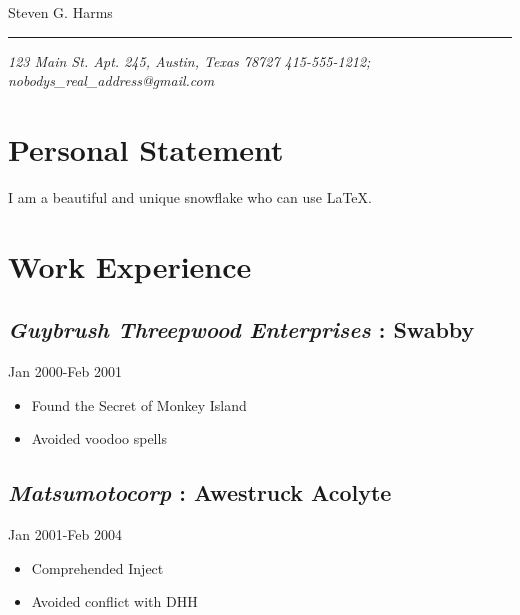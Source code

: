 \documentclass[]{article}
\begin{document}
\ifpdf
{}
\else
{}
\fi


\begin{center}
    \Huge Steven G. Harms
\end{center}
\vspace{-8pt} \rule{\textwidth}{1pt}

\vspace{-1pt} {\small\itshape 123 Main St. Apt. 245, Austin, Texas 78727  \hfill 415-555-1212; nobodys\_real\_address@gmail.com}





  \section*{ Personal Statement}
  I am a beautiful and unique snowflake who can use \LaTeX.


\section*{Work Experience}
\label{sec: work_experience}
\subsection*{\textit{Guybrush Threepwood Enterprises} : \textbf{Swabby}}
  \label{_guybrushthreepwoodenterprises_swabby}
  \textsf{Jan 2000-Feb 2001}

\begin{itemize}
    \item Found the Secret of Monkey Island
    \item Avoided voodoo spells
\end{itemize}

\subsection*{\textit{Matsumotocorp} : \textbf{Awestruck Acolyte}}
  \label{_matsumotocorp_awestruckacolyte}
  \textsf{Jan 2001-Feb 2004}

\begin{itemize}
    \item Comprehended Inject
    \item Avoided conflict with DHH
\end{itemize}
\end{document}
